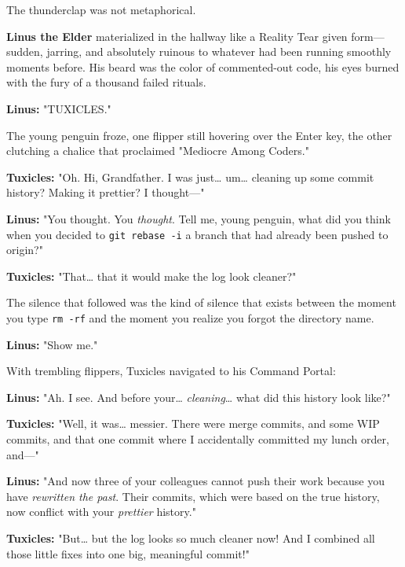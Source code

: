 The thunderclap was not metaphorical.

\textbf{Linus the Elder} materialized in the hallway like a Reality Tear given form---sudden, jarring, and absolutely ruinous to whatever had been running smoothly moments before. His beard was the color of commented-out code, his eyes burned with the fury of a thousand failed rituals.

\textbf{Linus:} "TUXICLES."

The young penguin froze, one flipper still hovering over the Enter key, the other clutching a chalice that proclaimed "Mediocre Among Coders."

\textbf{Tuxicles:} "Oh. Hi, Grandfather. I was just\ldots{} um\ldots{} cleaning up some commit history? Making it prettier? I thought---"

\textbf{Linus:} "You thought. You \emph{thought}. Tell me, young penguin, what did you think when you decided to \texttt{git\ rebase\ -i} a branch that had already been pushed to origin?"

\textbf{Tuxicles:} "That\ldots{} that it would make the log look cleaner?"

The silence that followed was the kind of silence that exists between the moment you type \texttt{rm\ -rf} and the moment you realize you forgot the directory name.

\textbf{Linus:} "Show me."

With trembling flippers, Tuxicles navigated to his Command Portal:


\textbf{Linus:} "Ah. I see. And before your\ldots{} \emph{cleaning}\ldots{} what did this history look like?"

\textbf{Tuxicles:} "Well, it was\ldots{} messier. There were merge commits, and some WIP commits, and that one commit where I accidentally committed my lunch order, and---"

\textbf{Linus:} "And now three of your colleagues cannot push their work because you have \emph{rewritten the past}. Their commits, which were based on the true history, now conflict with your \emph{prettier} history."

\textbf{Tuxicles:} "But\ldots{} but the log looks so much cleaner now! And I combined all those little fixes into one big, meaningful commit!"


